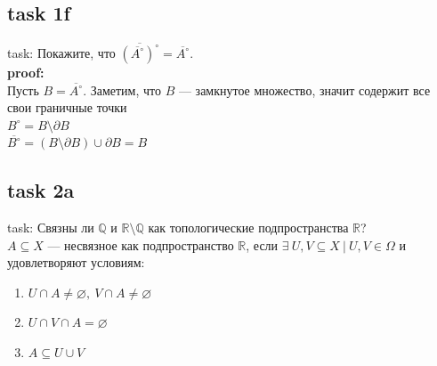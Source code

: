 \documentclass[12pt]{article}
\begin{document}



\subsection*{task 1f}

task: Покажите, что $\overline{\left(\overline{A^\circ}\right)^\circ} = \overline{A^\circ}$.\\

\textbf{proof:}\\
Пусть $B = \overline{A^\circ}$. Заметим, что $B$ --- замкнутое множество, значит содержит все свои граничные точки\\
$B^\circ = B \setminus \partial B$\\
$\overline{B^\circ} = (B \setminus \partial B) \cup \partial B = B$

\subsection*{task 2a}

task: Связны ли $\mathbb{Q}$ и $\mathbb{R}\setminus\mathbb{Q}$ как топологические подпространства $\mathbb{R}$?\\
$A \subseteq X$ --- несвязное как подпространство $\mathbb{R}$, если $\exists\ U, V \subseteq X\ |\ U, V \in \Omega$ и удовлетворяют условиям:
\begin{enumerate}
    \item $U\cap A \neq \varnothing,\ V\cap A \neq \varnothing$
    \item $U \cap V \cap A = \varnothing$
    \item $A \subseteq U \cup V$
\end{enumerate}
\end{document}
